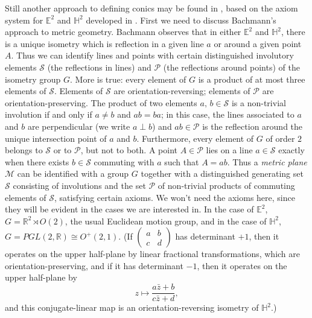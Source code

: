 \documentclass[12pt]{amsart}
\theoremstyle{definition}
\begin{document}
Still another approach to defining conics may be found in \cite{MR487028},
based on the axiom system for ${\mathbb E}^2$ and ${\mathbb H}^2$ developed in
\cite{MR0346643}. First we need to discuss Bachmann's approach to
metric geometry. Bachmann observes that in either ${\mathbb E}^2$ and ${\mathbb H}^2$, there
is a unique isometry which is reflection in a given line $a$ or around
a given point $A$.  Thus we can identify lines and points with certain
distinguished involutory elements ${\mathcal S}$ (the reflections in lines)
and ${\mathcal P}$  (the reflections around points) of the isometry group
$G$.  More is true: every element of $G$ is a product of at most three
elements of ${\mathcal S}$.  Elements of ${\mathcal S}$ are orientation-reversing; elements
of ${\mathcal P}$ are orientation-preserving. The product of two elements
$a,\,b\in {\mathcal S}$ is a non-trivial involution if and only if $a\ne b$ and
$ab=ba$; in this case, the lines associated to $a$ and $b$ are
perpendicular (we write $a\perp b$)
and $ab\in {\mathcal P}$ is the reflection around the unique intersection point
of $a$ and $b$. Furthermore, every element of $G$ of order $2$ belongs
to ${\mathcal S}$ or to ${\mathcal P}$, but not to both.  A point $A\in {\mathcal P}$ lies on a
line $a\in {\mathcal S}$ exactly when there exists $b\in {\mathcal S}$ commuting with
$a$ such that $A = ab$.  Thus a \emph{metric plane} ${\mathcal M}$
can be identified with a
group $G$ together with a distinguished generating set ${\mathcal S}$
consisting of involutions and the set ${\mathcal P}$ of non-trivial products of
commuting elements of ${\mathcal S}$, satisfying certain axioms.
We won't need the axioms here, since they will be evident in the
cases we are interested in. In the case of ${\mathbb E}^2$, $G={\mathbb R}^2\rtimes
O(2)$, the usual Euclidean 
motion group, and in the case of ${\mathbb H}^2$, $G=PGL(2,{\mathbb R})\cong
O^+(2,1)$. (If $\begin{pmatrix} a&b\\c&d\end{pmatrix}$ has determinant
$+1$, then it operates on the upper half-plane by linear fractional
transformations, which are orientation-preserving, and if it has
determinant $-1$, then it operates on the upper half-plane by
\[
z\mapsto \frac{a\bar z + b}{c\bar z + d},
\]
and this conjugate-linear map is an orientation-reversing isometry of
${\mathbb H}^2$.) 
\end{document}
